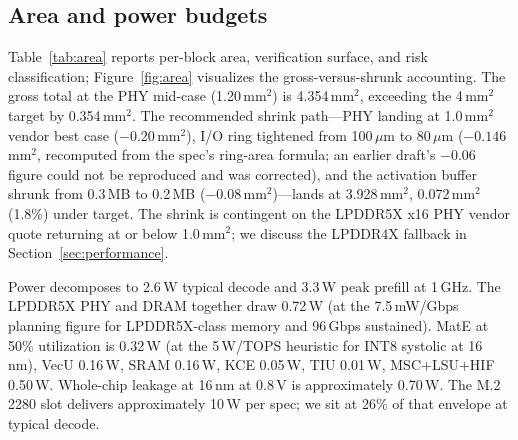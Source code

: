 \documentclass[conference]{IEEEtran}
\begin{document}
\subsection{Area and power budgets}

Table~\ref{tab:area} reports per-block area, verification surface, and risk classification; Figure~\ref{fig:area} visualizes the gross-versus-shrunk accounting. The gross total at the PHY mid-case (1.20\,mm$^2$) is 4.354\,mm$^2$, exceeding the 4\,mm$^2$ target by 0.354\,mm$^2$. The recommended shrink path---PHY landing at 1.0\,mm$^2$ vendor best case ($-0.20$\,mm$^2$), I/O ring tightened from 100\,$\mu$m to 80\,$\mu$m ($-0.146$\,mm$^2$, recomputed from the spec's ring-area formula; an earlier draft's $-0.06$ figure could not be reproduced and was corrected), and the activation buffer shrunk from 0.3\,MB to 0.2\,MB ($-0.08$\,mm$^2$)---lands at 3.928\,mm$^2$, 0.072\,mm$^2$ (1.8\%) under target. The shrink is contingent on the LPDDR5X x16 PHY vendor quote returning at or below 1.0\,mm$^2$; we discuss the LPDDR4X fallback in Section~\ref{sec:performance}.

Power decomposes to 2.6\,W typical decode and 3.3\,W peak prefill at 1\,GHz. The LPDDR5X PHY and DRAM together draw 0.72\,W (at the 7.5\,mW/Gbps planning figure for LPDDR5X-class memory and 96\,Gbps sustained). MatE at 50\% utilization is 0.32\,W (at the 5\,W/TOPS heuristic for INT8 systolic at 16\,nm), VecU 0.16\,W, SRAM 0.16\,W, KCE 0.05\,W, TIU 0.01\,W, MSC+LSU+HIF 0.50\,W. Whole-chip leakage at 16\,nm at 0.8\,V is approximately 0.70\,W. The M.2 2280 slot delivers approximately 10\,W per spec; we sit at 26\% of that envelope at typical decode.
\end{document}

